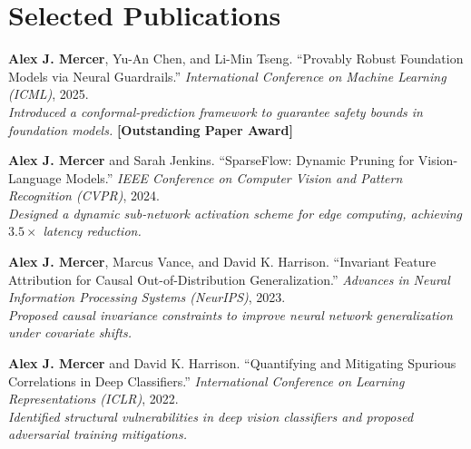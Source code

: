 \section{Selected Publications}
\begin{enumerate}[label={\textbf{[\arabic*]}}, leftmargin=*, itemsep=0.4em]
  \item \textbf{Alex J. Mercer}, Yu-An Chen, and Li-Min Tseng. ``Provably Robust Foundation Models via Neural Guardrails.'' \emph{International Conference on Machine Learning (ICML)}, 2025. \\
  \textit{Introduced a conformal-prediction framework to guarantee safety bounds in foundation models.} \hfill \color{accent}\textbf{[Outstanding Paper Award]}
  
  \item \textbf{Alex J. Mercer} and Sarah Jenkins. ``SparseFlow: Dynamic Pruning for Vision-Language Models.'' \emph{IEEE Conference on Computer Vision and Pattern Recognition (CVPR)}, 2024. \\
  \textit{Designed a dynamic sub-network activation scheme for edge computing, achieving $3.5\times$ latency reduction.}
  
  \item \textbf{Alex J. Mercer}, Marcus Vance, and David K. Harrison. ``Invariant Feature Attribution for Causal Out-of-Distribution Generalization.'' \emph{Advances in Neural Information Processing Systems (NeurIPS)}, 2023. \\
  \textit{Proposed causal invariance constraints to improve neural network generalization under covariate shifts.}
  
  \item \textbf{Alex J. Mercer} and David K. Harrison. ``Quantifying and Mitigating Spurious Correlations in Deep Classifiers.'' \emph{International Conference on Learning Representations (ICLR)}, 2022. \\
  \textit{Identified structural vulnerabilities in deep vision classifiers and proposed adversarial training mitigations.}
\end{enumerate}
